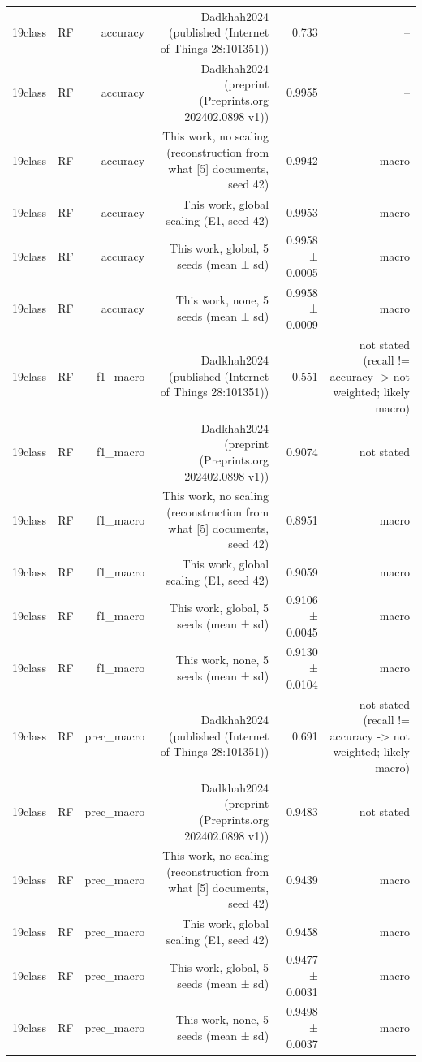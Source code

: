 \begin{table}[htbp]
{\begin{tabular}{lrrrrr}
19class & RF & accuracy & Dadkhah2024 (published (Internet of Things 28:101351)) & 0.733 & -- \\
19class & RF & accuracy & Dadkhah2024 (preprint (Preprints.org 202402.0898 v1)) & 0.9955 & -- \\
19class & RF & accuracy & This work, no scaling (reconstruction from what [5] documents, seed 42) & 0.9942 & macro \\
19class & RF & accuracy & This work, global scaling (E1, seed 42) & 0.9953 & macro \\
19class & RF & accuracy & This work, global, 5 seeds (mean ± sd) & 0.9958 ± 0.0005 & macro \\
19class & RF & accuracy & This work, none, 5 seeds (mean ± sd) & 0.9958 ± 0.0009 & macro \\
19class & RF & f1\_macro & Dadkhah2024 (published (Internet of Things 28:101351)) & 0.551 & not stated (recall != accuracy -> not weighted; likely macro) \\
19class & RF & f1\_macro & Dadkhah2024 (preprint (Preprints.org 202402.0898 v1)) & 0.9074 & not stated \\
19class & RF & f1\_macro & This work, no scaling (reconstruction from what [5] documents, seed 42) & 0.8951 & macro \\
19class & RF & f1\_macro & This work, global scaling (E1, seed 42) & 0.9059 & macro \\
19class & RF & f1\_macro & This work, global, 5 seeds (mean ± sd) & 0.9106 ± 0.0045 & macro \\
19class & RF & f1\_macro & This work, none, 5 seeds (mean ± sd) & 0.9130 ± 0.0104 & macro \\
19class & RF & prec\_macro & Dadkhah2024 (published (Internet of Things 28:101351)) & 0.691 & not stated (recall != accuracy -> not weighted; likely macro) \\
19class & RF & prec\_macro & Dadkhah2024 (preprint (Preprints.org 202402.0898 v1)) & 0.9483 & not stated \\
19class & RF & prec\_macro & This work, no scaling (reconstruction from what [5] documents, seed 42) & 0.9439 & macro \\
19class & RF & prec\_macro & This work, global scaling (E1, seed 42) & 0.9458 & macro \\
19class & RF & prec\_macro & This work, global, 5 seeds (mean ± sd) & 0.9477 ± 0.0031 & macro \\
19class & RF & prec\_macro & This work, none, 5 seeds (mean ± sd) & 0.9498 ± 0.0037 & macro \\

\end{tabular}}
\end{table}
